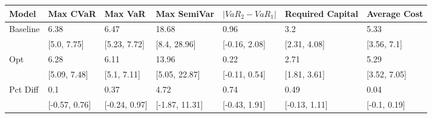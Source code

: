 \begin{tabular}{lllllll}
\toprule
   Model &      Max CVaR &       Max VaR &    Max SemiVar & $|VaR_2 - VaR_1|$ & Required Capital & Average Cost \\
\midrule
Baseline &          6.38 &          6.47 &          18.68 &              0.96 &              3.2 &         5.33 \\
         &   [5.0, 7.75] &  [5.23, 7.72] &   [8.4, 28.96] &     [-0.16, 2.08] &     [2.31, 4.08] &  [3.56, 7.1] \\
     Opt &          6.28 &          6.11 &          13.96 &              0.22 &             2.71 &         5.29 \\
         &  [5.09, 7.48] &   [5.1, 7.11] &  [5.05, 22.87] &     [-0.11, 0.54] &     [1.81, 3.61] & [3.52, 7.05] \\
Pct Diff &           0.1 &          0.37 &           4.72 &              0.74 &             0.49 &         0.04 \\
         & [-0.57, 0.76] & [-0.24, 0.97] & [-1.87, 11.31] &     [-0.43, 1.91] &    [-0.13, 1.11] & [-0.1, 0.19] \\
\bottomrule
\end{tabular}

